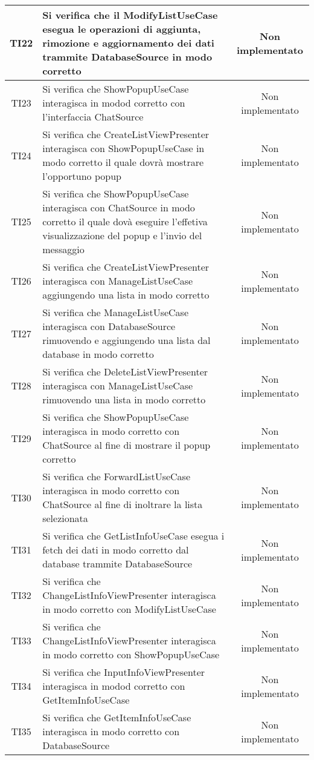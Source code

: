 \begin{center}
\begin{longtable}{|c|>{\centering}m{10cm}|c|}
		TI22 & Si verifica che il ModifyListUseCase esegua le operazioni di aggiunta, rimozione e aggiornamento dei dati trammite DatabaseSource in modo corretto & Non implementato \\ \hline
		TI23 & Si verifica che ShowPopupUseCase interagisca in modod corretto con l'interfaccia ChatSource & Non implementato \\ \hline
		TI24 & Si verifica che CreateListViewPresenter interagisca con ShowPopupUseCase in modo corretto il quale dovrà mostrare l'opportuno popup & Non implementato \\ \hline
		TI25 & Si verifica che ShowPopupUseCase interagisca con ChatSource in modo corretto il quale dovà eseguire l'effetiva visualizzazione del popup e l'invio del messaggio & Non implementato \\ \hline
		TI26 & Si verifica che CreateListViewPresenter interagisca con ManageListUseCase aggiungendo una lista in modo corretto & Non implementato \\ \hline
		TI27 & Si verifica che ManageListUseCase interagisca con DatabaseSource rimuovendo e aggiungendo una lista dal database in modo corretto & Non implementato \\ \hline
		TI28 & Si verifica che DeleteListViewPresenter interagisca con ManageListUseCase rimuovendo una lista in modo corretto & Non implementato \\ \hline
		TI29 & Si verifica che ShowPopupUseCase interagisca in modo corretto con ChatSource al fine di mostrare il popup corretto & Non implementato \\ \hline
		TI30 & Si verifica che ForwardListUseCase interagisca in modo corretto con ChatSource al fine di inoltrare la lista selezionata & Non implementato \\ \hline
		TI31 & Si verifica che GetListInfoUseCase esegua i fetch dei dati in modo corretto dal database trammite DatabaseSource & Non implementato \\ \hline
		TI32 & Si verifica che ChangeListInfoViewPresenter interagisca in modo corretto con ModifyListUseCase & Non implementato \\ \hline
		TI33 & Si verifica che ChangeListInfoViewPresenter interagisca in modo corretto con ShowPopupUseCase & Non implementato \\ \hline
		TI34 & Si verifica che InputInfoViewPresenter interagisca in modod corretto con GetItemInfoUseCase & Non implementato \\ \hline
		TI35 & Si verifica che GetItemInfoUseCase interagisca in modo corretto con DatabaseSource & Non implementato \\ \hline

\end{longtable}
\end{center}
